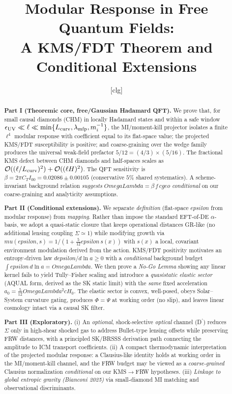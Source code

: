 \documentclass[aps,prd,onecolumn,superscriptaddress,nofootinbib]{revtex4-2}
\def\OmL{OmegaLambda}%
\def\cgeo{cgeo}%
\def\eps{epsilon}%
\def\mu{mu}%
\def\alpha{alpha}%
\def\alpha_M{alphaM}%
\def\Omega_\Lambda{OmegaLambda}%
\providecommand{\OmL}{\Omega_\Lambda}
\providecommand{\cgeo}{c_{\rm geo}}
\providecommand{\eps}{\varepsilon}
\begin{document}
\title{Modular Response in Free Quantum Fields:\\
A KMS/FDT Theorem and Conditional Extensions}

\author{[clg]}
\affiliation{[Institutions]}
\date{}

\begin{abstract}
\textbf{Part I (Theoremic core, free/Gaussian Hadamard QFT).} We prove that, for small causal diamonds (CHM) in locally Hadamard states and within a safe window \(\epsilon_{\rm UV}\ll\ell\ll \min\{L_{\rm curv},\lambda_{\rm mfp},m_i^{-1}\}\), the MI/moment-kill projector isolates a finite \(\ell^4\) modular response with coefficient equal to its flat-space value; the projected KMS/FDT susceptibility is positive; and coarse-graining over the wedge family produces the universal weak-field prefactor \(5/12=(4/3)\times(5/16)\). The fractional KMS defect between CHM diamonds and half-spaces scales as \(\mathcal O((\ell/L_{\rm curv})^2)+\mathcal O((\ell H)^2)\). The QFT sensitivity is \(\beta=2\pi C_T I_{00}=0.02086\pm 0.00105\) (conservative \(5\%\) shared systematics). A scheme-invariant background relation \emph{suggests} \(\OmL=\beta\, f\,\cgeo\) \emph{conditional} on our coarse-graining and analyticity assumptions.

\smallskip
\textbf{Part II (Conditional extensions).} We separate \emph{definition} (flat-space \(\eps\) from modular response) from \emph{mapping}. Rather than impose the standard EFT-of-DE \(\alpha\)-basis, we adopt a quasi-static closure that keeps operational distances GR-like (no additional lensing coupling \(\Sigma\simeq 1\)) while modifying growth via \(\mu(\eps,s)=1/(1+\tfrac{5}{12}\eps\,s(x))\) with \(s(x)\) a local, covariant environment modulation derived from the action. KMS/FDT positivity motivates an entropy-driven law \(d\eps/d\ln a\ge 0\) with a \emph{conditional} background budget \(\int \eps\,d \ln a=\OmL\). We then prove a \emph{No-Go Lemma} showing any linear kernel fails to yield Tully–Fisher scaling and introduce a \emph{quasistatic elastic sector} (AQUAL form, derived as the SK static limit) with the \emph{same} fixed acceleration \(a_0=\frac{5}{12}\OmL^2 c H_0\). The elastic sector is convex, well-posed, obeys Solar–System curvature gating, produces \(\Phi=\Psi\) at working order (no slip), and leaves linear cosmology intact via a causal SK filter.

\smallskip
\textbf{Part III (Exploratory).} (i) An \emph{optional}, shock-selective \emph{optical} channel (D\(^{\prime}\)) reduces \(\Sigma\) only in high-shear shocked gas to address Bullet-type lensing offsets while preserving FRW distances, with a principled SK/BRSSS derivation path connecting the amplitude to ICM transport coefficients. (ii) A compact thermodynamic interpretation of the projected modular response: a Clausius-like identity holds at working order in the MI/moment-kill channel, and the FRW budget may be viewed as a \emph{coarse-grained} Clausius normalization \emph{conditional} on our KMS\(\to\)FRW hypotheses. (iii) \emph{Linkage to global entropic gravity (Bianconi 2025)} via small-diamond MI matching and observational discriminants.


\end{abstract}
\end{document}
